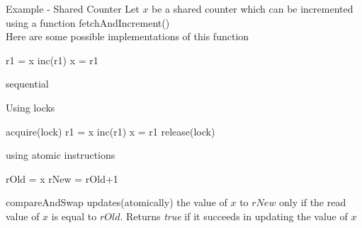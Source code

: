 \documentclass{beamer}
\begin{document}
\begin{frame}{Example - Shared Counter}
Let $x$ be a shared counter which can be incremented using a function fetchAndIncrement()\\
\pause
Here are some possible implementations of this function\\
\phantom{hello world}
\renewcommand{\thealgocf}{}
\begin{minipage}[t]{0.48\textwidth}
\begin{algorithm}[H]
\phantom{acquire(lock)\;}
r1 = x\;
inc(r1)\;
x = r1\;
\phantom{release(lock)\;}

\caption{\tiny sequential}
\end{algorithm}
\pause
\end{minipage}
\begin{minipage}[t]{0.48\textwidth}
\begin{algorithm}[H]
\caption{\tiny Using locks}
acquire(lock)\;
r1 = x\;
inc(r1)\;
x = r1\;
release(lock)\;

\end{algorithm}
\end{minipage}
\pause
\begin{center}
\begin{minipage}[t]{0.65\textwidth}
\begin{algorithm}[H]
\caption{\tiny using atomic instructions}
{
rOld = x\;
rNew = rOld+1\;
}
\end{algorithm}
\end{minipage}
\end{center}
\footnotesize compareAndSwap updates(atomically) the value of $x$ to $rNew$ only if the read value of $x$ is equal to $rOld$. Returns \textit{true} if it succeeds in updating the value of $x$
\end{frame}
\end{document}
